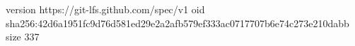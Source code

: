 version https://git-lfs.github.com/spec/v1
oid sha256:42d6a1951fc9d76d581ed29e2a2afb579ef333ac0717707b6e74c273e210dabb
size 337
